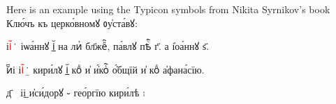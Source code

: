 Here is an example using the Typicon symbols from Nikita Syrnikov's book {\glyphfont Клю́чъ къ церко́вномꙋ ᲂу҆ста́вꙋ}:

\begin{russian}
{\glyphfont \large
і\textcolor{red}{і}꙼̇ ⧟̇҃ іѡа́ннꙋ і̲꙼ на лиⷮ бл҃жеⷩ҇, па́влꙋ пѣⷭ҇ г҃. а і҆оа́ннꙋ ѕ҃.

и᷷͏҃і і\textcolor{red}{і}꙼̇ ⧟̲̇҃ кири́лꙋ і̲꙼ коⷣ и҆ и҆́коⷭ҇ о҆́бщїй и҆ коⷣ а҆фана́сїю.

д҃ 🤉 іі̲ и҆си́дорꙋ ⹇ гео́ргїю кири́лѣ ⹉

}
\end{russian}

